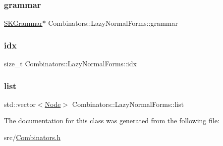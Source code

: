 \subsubsection{\texorpdfstring{grammar}{grammar}}
{\footnotesize\ttfamily \hyperlink{class_combinators_1_1_s_k_grammar}{S\+K\+Grammar}$\ast$ Combinators\+::\+Lazy\+Normal\+Forms\+::grammar}

\mbox{\label{class_combinators_1_1_lazy_normal_forms_aad988f6c06e3e1cf4e516ecfc1198c7f}} 
\subsubsection{\texorpdfstring{idx}{idx}}
{\footnotesize\ttfamily size\+\_\+t Combinators\+::\+Lazy\+Normal\+Forms\+::idx}

\mbox{\label{class_combinators_1_1_lazy_normal_forms_aad1e727e4cdf1e6d85c79359698a756b}} 
\subsubsection{\texorpdfstring{list}{list}}
{\footnotesize\ttfamily std\+::vector$<$\hyperlink{class_node}{Node}$>$ Combinators\+::\+Lazy\+Normal\+Forms\+::list}



The documentation for this class was generated from the following file\+:\begin{DoxyCompactItemize}
\item 
src/\hyperlink{_combinators_8h}{Combinators.\+h}\end{DoxyCompactItemize}
